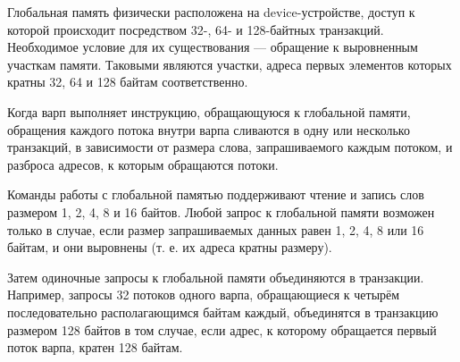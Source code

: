 Глобальная память физически расположена на device-устройстве, доступ к
которой происходит посредством 32-, 64- и 128-байтных транзакций. Необходимое условие для их существования --- обращение к выровненным участкам
памяти. Таковыми являются участки, адреса первых элементов которых кратны
32, 64 и 128 байтам соответственно.

Когда варп выполняет инструкцию, обращающуюся к глобальной памяти,
обращения каждого потока внутри варпа сливаются в одну или несколько транзакций, в зависимости от размера слова, запрашиваемого каждым потоком, и
разброса адресов, к которым обращаются потоки.

Команды работы с глобальной памятью поддерживают чтение и запись
слов размером 1, 2, 4, 8 и 16 байтов. Любой запрос к глобальной памяти возможен только в случае, если размер запрашиваемых данных равен 1, 2, 4, 8 или 16
байтам, и они выровнены (т. е. их адреса кратны размеру).

Затем одиночные запросы к глобальной памяти объединяются в транзакции. Например, запросы 32 потоков одного варпа, обращающиеся к четырём последовательно располагающимся байтам каждый, объединятся в транзакцию размером 128 байтов в том случае, если адрес, к которому обращается первый поток варпа, кратен 128 байтам.

\clearpage